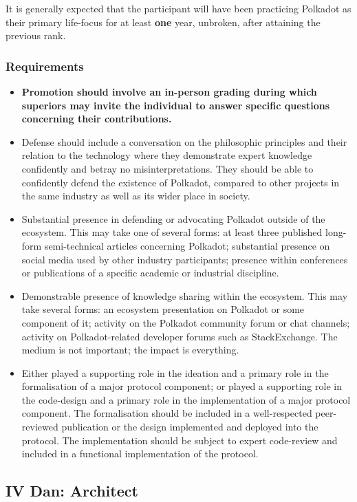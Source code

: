 \documentclass[9pt,oneside]{amsart}
\begin{document}
It is generally expected that the participant will have been practicing Polkadot as their primary life-focus for at least \textbf{one} year, unbroken, after attaining the previous rank.

\subsubsection{Requirements}\label{requirements-3}

\begin{itemize}
\item \textbf{Promotion should involve an in-person grading during which superiors may invite the individual to answer specific questions concerning their contributions.}
\item Defense should include a conversation on the philosophic principles and their relation to the technology where they demonstrate expert knowledge confidently and betray no misinterpretations. They should be able to confidently defend the existence of Polkadot, compared to other projects in the same industry as well as its wider place in society.
\item Substantial presence in defending or advocating Polkadot outside of the ecosystem. This may take one of several forms: at least three published long-form semi-technical articles concerning Polkadot; substantial presence on social media used by other industry participants; presence within conferences or publications of a specific academic or industrial discipline.
\item Demonstrable presence of knowledge sharing within the ecosystem. This may take several forms: an ecosystem presentation on Polkadot or some component of it; activity on the Polkadot community forum or chat channels; activity on Polkadot-related developer forums such as StackExchange. The medium is not important; the impact is everything.
\item Either played a supporting role in the ideation and a primary role in the formalisation of a major protocol component; or played a supporting role in the code-design and a primary role in the implementation of a major protocol component. The formalisation should be included in a well-respected peer-reviewed publication or the design implemented and deployed into the protocol. The implementation should be subject to expert code-review and included in a functional implementation of the protocol.
\end{itemize}

\subsection{IV Dan: Architect}\label{iv-dan-architect}~\\
\end{document}
